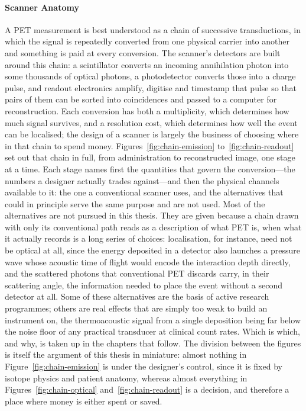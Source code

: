 \paragraph{Scanner Anatomy}
A PET measurement is best understood as a chain of successive transductions, in which the signal is repeatedly converted from one physical carrier into another and something is paid at every conversion.
The scanner's detectors are built around this chain: a scintillator converts an incoming annihilation photon into some thousands of optical photons, a photodetector converts those into a charge pulse, and readout electronics amplify, digitise and timestamp that pulse so that pairs of them can be sorted into coincidences and passed to a computer for reconstruction.
Each conversion has both a multiplicity, which determines how much signal survives, and a resolution cost, which determines how well the event can be localised; the design of a scanner is largely the business of choosing where in that chain to spend money.
Figures~\ref{fig:chain-emission} to~\ref{fig:chain-readout} set out that chain in full, from administration to reconstructed image, one stage at a time.
Each stage names first the quantities that govern the conversion---the numbers a designer actually trades against---and then the physical channels available to it: the one a conventional scanner uses, and the alternatives that could in principle serve the same purpose and are not used.
Most of the alternatives are not pursued in this thesis.
They are given because a chain drawn with only its conventional path reads as a description of what PET is, when what it actually records is a long series of choices: localisation, for instance, need not be optical at all, since the energy deposited in a detector also launches a pressure wave whose acoustic time of flight would encode the interaction depth directly, and the scattered photons that conventional PET discards carry, in their scattering angle, the information needed to place the event without a second detector at all.
Some of these alternatives are the basis of active research programmes; others are real effects that are simply too weak to build an instrument on, the thermoacoustic signal from a single  deposition being far below the noise floor of any practical transducer at clinical count rates.
Which is which, and why, is taken up in the chapters that follow.
The division between the figures is itself the argument of this thesis in miniature: almost nothing in Figure~\ref{fig:chain-emission} is under the designer's control, since it is fixed by isotope physics and patient anatomy, whereas almost everything in Figures~\ref{fig:chain-optical} and~\ref{fig:chain-readout} is a decision, and therefore a place where money is either spent or saved.

